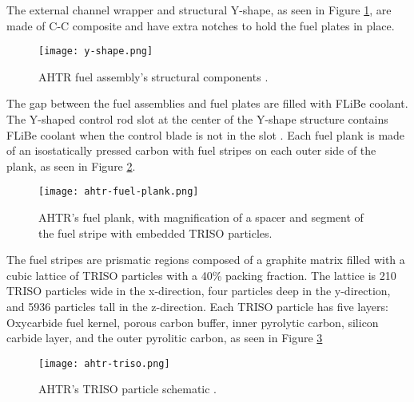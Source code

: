 The external channel wrapper and structural Y-shape, as seen in Figure 
\ref{fig:y-shape}, are made of C-C composite and have extra notches to hold 
the fuel plates in place.
\begin{figure}[]
    \centering
    \texttt{[image: y-shape.png]} 
    \caption{\acrlong{AHTR} fuel assembly's structural components 
    \cite{noauthor_fluoride_nodate}.}
    \label{fig:y-shape}
\end{figure}
The gap between the fuel assemblies and fuel plates are filled with \gls{FLiBe}
coolant. 
The Y-shaped control rod slot at the center of the Y-shape structure contains 
\gls{FLiBe} coolant when the control blade is not in the slot
\cite{varma_ahtr_2012,ramey_monte_2018,noauthor_fluoride_nodate}.
Each fuel plank is made of an isostatically pressed carbon with fuel stripes 
on each outer side of the plank, as seen in Figure \ref{fig:ahtr-fuel-plank}. 
\begin{figure}[]
    \centering
    \texttt{[image: ahtr-fuel-plank.png]} 
    \caption{\acrlong{AHTR}'s fuel plank, with magnification of 
    a spacer and segment of the fuel stripe with embedded TRISO particles.}
    \label{fig:ahtr-fuel-plank}
\end{figure}
The fuel stripes are prismatic regions composed of a graphite matrix filled with 
a cubic lattice of \gls{TRISO} particles with a 40\% packing fraction. 
The lattice is 210 \gls{TRISO} particles wide in the x-direction, four particles 
deep in the y-direction, and 5936 particles tall in the z-direction. 
Each \gls{TRISO} particle has five layers: Oxycarbide fuel kernel, porous carbon 
buffer, inner pyrolytic carbon, silicon carbide layer, and the outer pyrolitic 
carbon, as seen in Figure \ref{fig:ahtr-triso}
\begin{figure}[]
    \centering
    \texttt{[image: ahtr-triso.png]} 
    \caption{\acrlong{AHTR}'s TRISO particle schematic \cite{noauthor_fluoride_nodate}.}
    \label{fig:ahtr-triso}
\end{figure}

